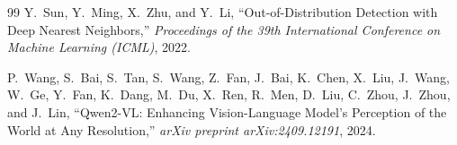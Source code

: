 \documentclass[12pt, a4paper, twoside]{article}
\begin{document}
\begin{thebibliography}{99}
  Y.\ Sun, Y.\ Ming, X.\ Zhu, and Y.\ Li,
  ``Out-of-Distribution Detection with Deep Nearest Neighbors,''
  \textit{Proceedings of the 39th International Conference on Machine Learning (ICML)}, 2022.

  P.\ Wang, S.\ Bai, S.\ Tan, S.\ Wang, Z.\ Fan, J.\ Bai, K.\ Chen, X.\ Liu, J.\ Wang, W.\ Ge, Y.\ Fan, K.\ Dang, M.\ Du, X.\ Ren, R.\ Men, D.\ Liu, C.\ Zhou, J.\ Zhou, and J.\ Lin,
  ``Qwen2-VL: Enhancing Vision-Language Model's Perception of the World at Any Resolution,''
  \textit{arXiv preprint arXiv:2409.12191}, 2024.

\end{thebibliography}
\end{document}

